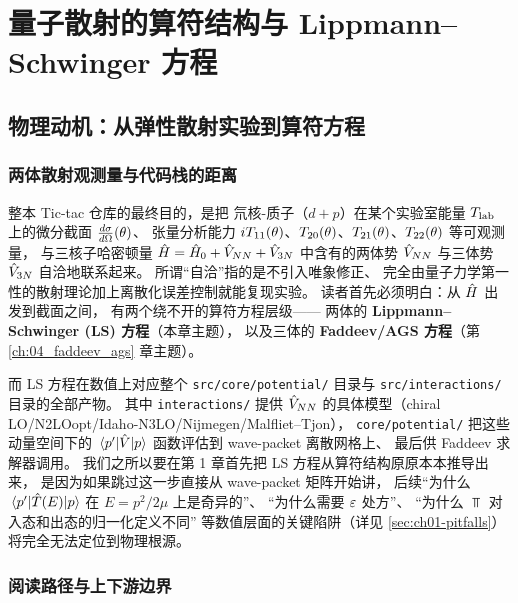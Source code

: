 
\chapter{量子散射的算符结构与 Lippmann--Schwinger 方程}
\label{ch:01_lippmann_schwinger}

\section{物理动机：从弹性散射实验到算符方程}
\label{sec:ch01-motivation}

\subsection{两体散射观测量与代码栈的距离}

整本 Tic-tac 仓库的最终目的，是把
氘核-质子（$d+p$）在某个实验室能量 ${T_{\text{lab}}}$ 上的微分截面 $\frac{d\sigma}{d\Omega}(\theta)$、
张量分析能力 ${i T_{11}}(\theta)$、${T_{20}}(\theta)$、${T_{21}}(\theta)$、${T_{22}}(\theta)$ 等可观测量，
与三核子哈密顿量 $\hat{H} = \hat{H}_0 + \hat{V}_{NN} + \hat{V}_{3N}$ 中含有的两体势 $\hat{V}_{NN}$
与三体势 $\hat{V}_{3N}$ 自洽地联系起来。
所谓“自洽”指的是不引入唯象修正、
完全由量子力学第一性的散射理论加上离散化误差控制就能复现实验。
读者首先必须明白：从 $\hat{H}$ 出发到截面之间，
有两个绕不开的算符方程层级——
两体的 \textbf{Lippmann--Schwinger (LS) 方程}（本章主题），
以及三体的 \textbf{Faddeev/AGS 方程}（第 \ref{ch:04_faddeev_ags} 章主题）。

而 LS 方程在数值上对应整个 \texttt{src/core/potential/} 目录与 \texttt{src/interactions/} 目录的全部产物。
其中 \texttt{interactions/} 提供 $\hat{V}_{NN}$ 的具体模型（chiral LO/N2LOopt/Idaho-N3LO/Nijmegen/Malfliet--Tjon），
\texttt{core/potential/} 把这些动量空间下的 $\matrixel{p'}{\Vop}{p}$ 函数评估到 wave-packet 离散网格上、
最后供 Faddeev 求解器调用。
我们之所以要在第 1 章首先把 LS 方程从算符结构原原本本推导出来，
是因为如果跳过这一步直接从 wave-packet 矩阵开始讲，
后续“为什么 $\matrixel{p'}{\Top(E)}{p}$ 在 $E = p^2/2\mu$ 上是奇异的”、
“为什么需要 $\varepsilon$ 处方”、
“为什么 $\Top$ 对入态和出态的归一化定义不同”
等数值层面的关键陷阱（详见 \cref{sec:ch01-pitfalls}）将完全无法定位到物理根源。

\subsection{阅读路径与上下游边界}

